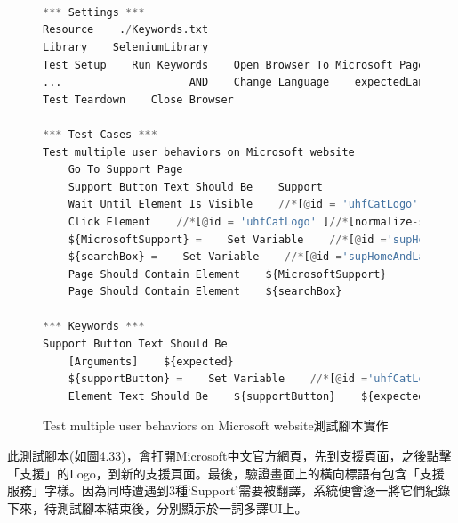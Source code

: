 \hspace*{\fill} \\
\\ \hspace*{\fill} \\
\begin{figure}[H]
\begin{lstlisting}[language={python}]
*** Settings ***
Resource    ./Keywords.txt
Library    SeleniumLibrary
Test Setup    Run Keywords    Open Browser To Microsoft Page
...                    AND    Change Language    expectedLanguage=${language}
Test Teardown    Close Browser

*** Test Cases ***
Test multiple user behaviors on Microsoft website
    Go To Support Page
    Support Button Text Should Be    Support
    Wait Until Element Is Visible    //*[@id = 'uhfCatLogo' ]//*[normalize-space()='Support']
    Click Element    //*[@id = 'uhfCatLogo' ]//*[normalize-space()='Support']
    ${MicrosoftSupport} =    Set Variable    //*[@id ='supHomeAndLandingPageHeaderContainer']//*[contains(text(), 'Support')]
    ${searchBox} =    Set Variable    //*[@id ='supHomeAndLandingPageSearchBox' and @placeholder ='How can we help you?']
    Page Should Contain Element    ${MicrosoftSupport}
    Page Should Contain Element    ${searchBox}

*** Keywords ***
Support Button Text Should Be
    [Arguments]    ${expected}
    ${supportButton} =    Set Variable    //*[@id ='uhfCatLogo']
    Element Text Should Be    ${supportButton}    ${expected}
\end{lstlisting}
\caption{Test multiple user behaviors on Microsoft website測試腳本實作}
\end{figure}
此測試腳本(如圖4.33)，會打開Microsoft中文官方網頁，先到支援頁面，之後點擊「支援」的Logo，到新的支援頁面。最後，驗證畫面上的橫向標語有包含「支援服務」字樣。因為同時遭遇到3種‘Support’需要被翻譯，系統便會逐一將它們紀錄下來，待測試腳本結束後，分別顯示於一詞多譯UI上。

